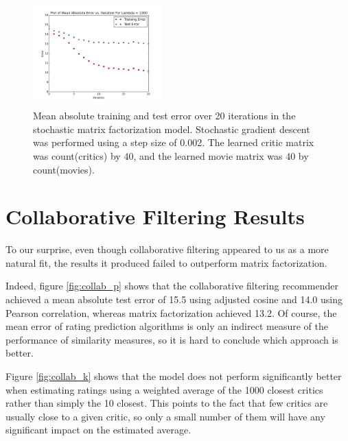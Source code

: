 \documentclass[10.5pt]{article}
\newcommand{\matrixtesterror}{13.2}
\newcommand{\factwidth}{0.44}
\newcommand{\factheight}{1.6in}
\begin{document}
\begin{figure}[H]
\includegraphics[width=0\factwidth\textwidth,height=\factheight]{matrix_plots/test-i40d40l1000.png}
\caption{Mean absolute training and test error over 20 iterations in the stochastic matrix factorization model. Stochastic gradient descent was performed using a step size of 0.002. The learned critic matrix was count(critics) by 40, and the learned movie matrix was 40 by count(movies).}
\label{fig:fac-d40}
\end{figure}



\section{Collaborative Filtering Results}

To our surprise, even though collaborative filtering appeared to us as a more
natural fit, the results it produced failed to outperform matrix factorization.

Indeed, figure \ref{fig:collab_p}  shows that the collaborative filtering
recommender achieved a mean absolute test
error of 15.5 using adjusted cosine and 14.0 using Pearson correlation, whereas
matrix factorization achieved \matrixtesterror. Of course, the mean error of
rating prediction algorithms is only an indirect measure of the performance of
similarity measures, so it is hard to conclude which approach is better.

Figure \ref{fig:collab_k} shows that the model does not perform significantly
better when estimating ratings using
a weighted average of the 1000 closest critics rather than simply the 10
closest. This points to the fact that few critics are usually close to a given
critic, so only a small number of them will have any significant impact on
the estimated average.
\end{document}
